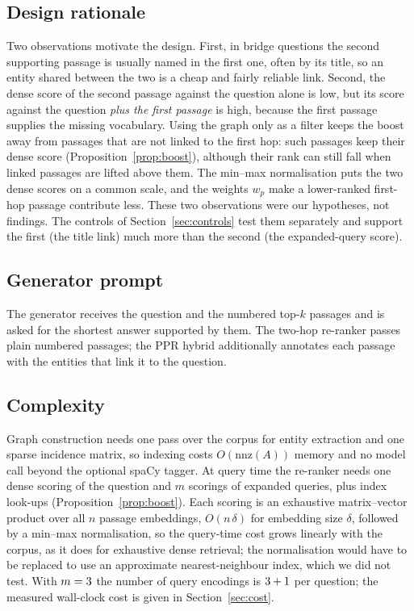 \documentclass[a4paper,fleqn]{cas-sc}
\begin{document}
\subsection{Design rationale}
Two observations motivate the design. First, in bridge questions the second supporting passage is usually named in the first one, often by its title, so an entity shared between the two is a cheap and fairly reliable link. Second, the dense score of the second passage against the question alone is low, but its score against the question \emph{plus the first passage} is high, because the first passage supplies the missing vocabulary. Using the graph only as a filter keeps the boost away from passages that are not linked to the first hop: such passages keep their dense score (Proposition~\ref{prop:boost}), although their rank can still fall when linked passages are lifted above them. The min--max normalisation puts the two dense scores on a common scale, and the weights $w_p$ make a lower-ranked first-hop passage contribute less. These two observations were our hypotheses, not findings. The controls of Section~\ref{sec:controls} test them separately and support the first (the title link) much more than the second (the expanded-query score).

\subsection{Generator prompt}
The generator receives the question and the numbered top-$k$ passages and is asked for the shortest answer supported by them. The two-hop re-ranker passes plain numbered passages; the PPR hybrid additionally annotates each passage with the entities that link it to the question.

\subsection{Complexity}
Graph construction needs one pass over the corpus for entity extraction and one sparse incidence matrix, so indexing costs $O(\mathrm{nnz}(A))$ memory and no model call beyond the optional spaCy tagger. At query time the re-ranker needs one dense scoring of the question and $m$ scorings of expanded queries, plus index look-ups (Proposition~\ref{prop:boost}). Each scoring is an exhaustive matrix--vector product over all $n$ passage embeddings, $O(n\,\delta)$ for embedding size $\delta$, followed by a min--max normalisation, so the query-time cost grows linearly with the corpus, as it does for exhaustive dense retrieval; the normalisation would have to be replaced to use an approximate nearest-neighbour index, which we did not test. With $m=3$ the number of query encodings is $3+1$ per question; the measured wall-clock cost is given in Section~\ref{sec:cost}.
\end{document}
